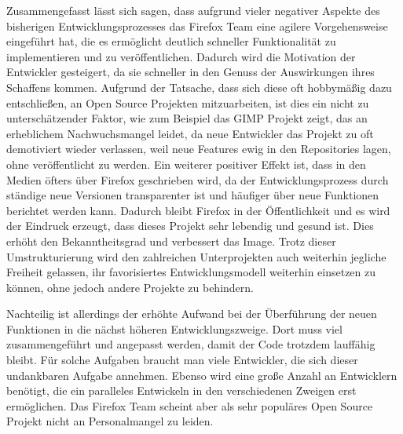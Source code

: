 Zusammengefasst lässt sich sagen, dass aufgrund vieler negativer Aspekte des bisherigen Entwicklungsprozesses das Firefox Team eine agilere Vorgehensweise eingeführt hat, die es ermöglicht deutlich schneller Funktionalität zu implementieren und zu veröffentlichen. Dadurch wird die Motivation der Entwickler gesteigert, da sie schneller in den Genuss der Auswirkungen ihres Schaffens kommen. Aufgrund der Tatsache, dass sich diese oft hobbymäßig dazu entschließen, an Open Source Projekten mitzuarbeiten, ist dies ein nicht zu unterschätzender Faktor, wie zum Beispiel das GIMP Projekt zeigt, das an erheblichem Nachwuchsmangel leidet, da neue Entwickler das Projekt zu oft demotiviert wieder verlassen, weil neue Features ewig in den Repositories lagen, ohne veröffentlicht zu werden\cite{bib:gimp}. Ein weiterer positiver Effekt ist, dass in den Medien öfters über Firefox geschrieben wird, da der Entwicklungsprozess durch ständige neue Versionen transparenter ist und häufiger über neue Funktionen berichtet werden kann. Dadurch bleibt Firefox in der Öffentlichkeit und es  wird der Eindruck erzeugt, dass dieses Projekt sehr lebendig und gesund ist. Dies erhöht den Bekanntheitsgrad und verbessert das Image. Trotz dieser Umstrukturierung wird den zahlreichen Unterprojekten auch weiterhin jegliche Freiheit gelassen, ihr favorisiertes Entwicklungsmodell weiterhin einsetzen zu können, ohne jedoch andere Projekte zu behindern.

Nachteilig ist allerdings der erhöhte Aufwand bei der Überführung der neuen Funktionen in die nächst höheren Entwicklungszweige. Dort muss viel zusammengeführt und angepasst werden, damit der Code trotzdem lauffähig bleibt. Für solche Aufgaben braucht man viele Entwickler, die sich dieser undankbaren Aufgabe annehmen. Ebenso wird eine große Anzahl an Entwicklern benötigt, die ein paralleles Entwickeln in den verschiedenen Zweigen erst ermöglichen. Das Firefox Team scheint aber als sehr populäres Open Source Projekt nicht an Personalmangel zu leiden.

